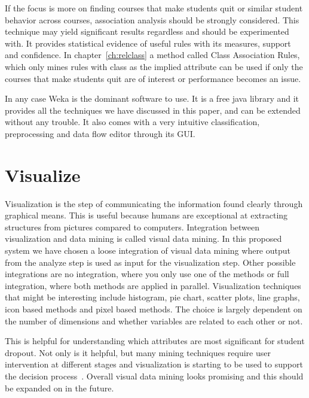 \bigskip\noindent
If the focus is more on finding courses that make students quit or similar student behavior across courses, association analysis should be strongly considered. This technique may yield significant results regardless and should be experimented with. It provides statistical evidence of useful rules with its measures, support and confidence. In chapter~\ref{ch:relclass} a method called Class Association Rules, which only mines rules with class as the implied attribute can be used if only the courses that make students quit are of interest or performance becomes an issue.

\bigskip\noindent
In any case Weka is the dominant software to use. 
It is a free java library and it provides all the techniques we have discussed in this paper, and can be extended without any trouble.
It also comes with a very intuitive classification, preprocessing and data flow editor through its GUI.

\section{Visualize}	
Visualization is the step of communicating the information found clearly through graphical means. 
This is useful because humans are exceptional at extracting structures from pictures compared to computers. 
Integration between visualization and data mining is called visual data mining.
In this proposed system we have chosen a loose integration of visual data mining where output from the analyze step is used as input for the visualization step.
Other possible integrations are no integration, where you only use one of the methods or full integration, where both methods are applied in parallel.
Visualization techniques that might be interesting include histogram, pie chart, scatter plots, line graphs, icon based methods and pixel based methods.
The choice is largely dependent on the number of dimensions and whether variables are related to each other or not.

\bigskip\noindent
This is helpful for understanding which attributes are most significant for student dropout. 
Not only is it helpful, but many mining techniques require user intervention at different stages and visualization is starting to be used to support the decision process~\cite{1207445}.
Overall visual data mining looks promising and this should be expanded on in the future.
